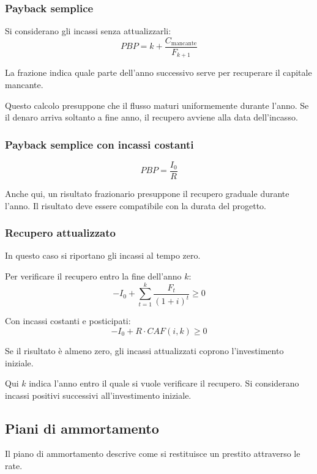 \subsubsection*{Payback semplice}

\noindent
Si considerano gli incassi senza attualizzarli:
\[
    PBP
    =
    k+\frac{C_{\text{mancante}}}{F_{k+1}}
\]

\noindent
La frazione indica quale parte dell'anno successivo
serve per recuperare il capitale mancante.

\noindent
Questo calcolo presuppone che il flusso maturi
uniformemente durante l'anno.
Se il denaro arriva soltanto a fine anno,
il recupero avviene alla data dell'incasso.

\subsubsection*{Payback semplice con incassi costanti}

\[
    PBP=\frac{I_0}{R}
\]

\noindent
Anche qui, un risultato frazionario presuppone
il recupero graduale durante l'anno.
Il risultato deve essere compatibile con la durata
del progetto.

\subsubsection*{Recupero attualizzato}

\noindent
In questo caso si riportano gli incassi al tempo zero.

\noindent
Per verificare il recupero entro la fine dell'anno $k$:
\[
    -I_0+\sum_{t=1}^{k}\frac{F_t}{(1+i)^t}\geq0
\]

\noindent
Con incassi costanti e posticipati:
\[
    -I_0+R\cdot CAF(i,k)\geq0
\]

\noindent
Se il risultato è almeno zero, gli incassi attualizzati
coprono l'investimento iniziale.

\noindent
Qui $k$ indica l'anno entro il quale si vuole verificare
il recupero. Si considerano incassi positivi successivi
all'investimento iniziale.

\subsection{Piani di ammortamento}

\noindent
Il piano di ammortamento descrive come si restituisce
un prestito attraverso le rate.


